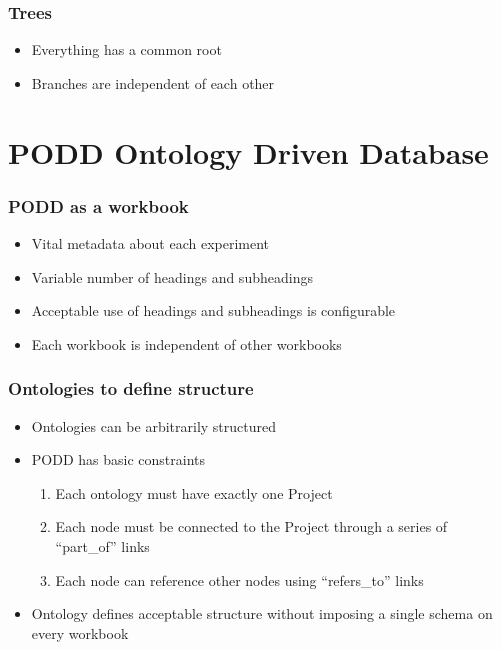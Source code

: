 \documentclass[12pt]{beamer}
\begin{document}
\begin{frame}
\frametitle{Trees}

\begin{itemize}
 \item Everything has a common root
\pause
 \item Branches are independent of each other
\end{itemize}

\end{frame}

\section{PODD Ontology Driven Database}

\begin{frame}
\frametitle{PODD as a workbook}

\begin{itemize}
 \item Vital metadata about each experiment
\pause
 \item Variable number of headings and subheadings
\pause
 \item Acceptable use of headings and subheadings is configurable
\pause
 \item Each workbook is independent of other workbooks
\end{itemize}

\end{frame}


\begin{frame}
\frametitle{Ontologies to define structure}

\begin{itemize}
 \item Ontologies can be arbitrarily structured
\pause
 \item PODD has basic constraints
\begin{enumerate}
 \item Each ontology must have exactly one Project
 \item Each node must be connected to the Project through a series of ``part\_of'' links
 \item Each node can reference other nodes using ``refers\_to'' links
\end{enumerate}
\pause
\item Ontology defines acceptable structure without imposing a single schema on every workbook

\end{itemize}

\end{frame}
\end{document}
